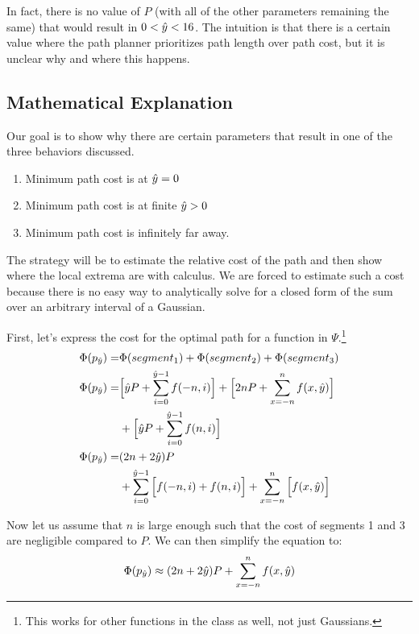 In fact, there is no value of $P$ (with all of the other parameters remaining the same) that would result in $0<\hat{y}<16$. The intuition is that there is a certain value where the path planner prioritizes path length over path cost, but it is unclear why and where this happens. 





\subsection{Mathematical Explanation}
Our goal is to show why there are certain parameters that result in one of the three behaviors discussed. 
\begin{enumerate}
\item Minimum path cost is at $\hat{y}=0$
\item Minimum path cost is at finite $\hat{y}>0$
\item Minimum path cost is infinitely far away. 
\end{enumerate}

The strategy will be to estimate the relative cost of the path and then show where the local extrema are with calculus. We are forced to estimate such a cost because there is no easy way to analytically solve for a closed form of the sum over an arbitrary interval of a Gaussian. 

First, let's express the cost for the optimal path for a function in $\Psi$.\footnote{This works for other functions in the class as well, not just Gaussians.}
\begin{align*}
\Phi(p_{\hat{y}}) =&\Phi(segment_1) + \Phi(segment_2) + \Phi(segment_3) \\
\Phi(p_{\hat{y}}) =&\Big[\hat{y} P + \sum\limits_{i=0}^{\hat{y}-1} f(-n, i) \Big] +
         \Big[2nP + \sum\limits_{x=-n}^{n}    f(x,\hat{y}) \Big]\\
     &+\Big[\hat{y} P + \sum\limits_{i=0}^{\hat{y}-1} f(n, i) \Big] \\
\Phi(p_{\hat{y}}) =&(2n+2\hat{y})P \\ &+\sum\limits_{i=0}^{\hat{y}-1} \Big[ f(-n, i) + f(n, i) \Big] + \sum\limits_{x=-n}^{n} \Big[f(x,\hat{y}) \Big]
\end{align*}

Now let us assume that $n$ is large enough such that the cost of segments 1 and 3 are negligible compared to $P$. We can then simplify the equation to:
\[
\Phi(p_{\hat{y}}) \approx (2n+2\hat{y})P +  \sum\limits_{x=-n}^{n} f(x,\hat{y})
\]

